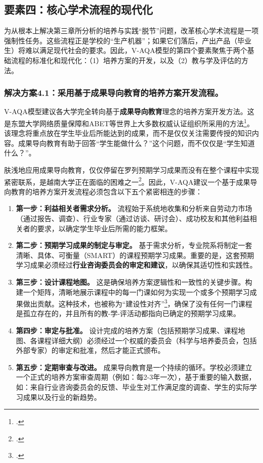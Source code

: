 

\subsection{要素四：核心学术流程的现代化}
\label{subsec:giaiphap_quytringnoibo}

为从根本上解决第三章所分析的培养与实践“脱节”问题，改革核心学术流程是一项强制性任务。这些流程正是学校的“生产机器”；如果它们落后，产出产品（毕业生）将难以满足现代社会的要求。因此，V-AQA模型的第四个要素聚焦于两个基础流程的标准化和现代化：（1）培养方案的开发，以及（2）教与学及评估的方法。

\subsubsection{解决方案4.1：采用基于成果导向教育的培养方案开发流程。}
V-AQA模型建议各大学完全转向基于\textbf{成果导向教育}理念的培养方案开发方法。这是东盟大学网络质量保障和ABET等世界上大多数权威认证组织所采用的方法\footcite{aunqa_guidelines_v4}。该理念将重点放在学生毕业后所能达到的成果，而不是仅仅关注需要传授的知识内容。成果导向教育有助于回答“学生能做什么？”这个问题，而不仅仅是“学生知道什么？”。

肤浅地应用成果导向教育，仅仅停留在罗列预期学习成果而没有在整个课程中实现紧密联系，是越南大学正在面临的困难之一\footcite{ijlter_elo_copy}。因此，V-AQA建议一个基于成果导向教育的培养方案开发流程必须包含以下五个紧密相连的步骤：

\begin{enumerate}
    \item \textbf{第一步：利益相关者需求分析。} 流程始于系统地收集和分析来自劳动力市场（通过报告、调查）、行业专家（通过访谈、研讨会）、成功校友和其他利益相关者的要求，以确定学生毕业后所需的能力框架。
    
    \item \textbf{第二步：预期学习成果的制定与审定。} 基于需求分析，专业院系将制定一套清晰、具体、可衡量（SMART）的课程预期学习成果。重要的是，这套预期学习成果必须经过\textbf{行业咨询委员会的审定和建议}，以确保其适切性和实践性。
    
    \item \textbf{第三步：设计课程地图。} 这是确保培养方案逻辑性和一致性的关键步骤。构建一个矩阵，清晰地展示课程中的每一门课如何为实现一个或多个预期学习成果做出贡献。这种技术，也被称为“建设性对齐”\footcite{biggs_constructive_alignment}，确保了没有任何一门课程是孤立存在的，并且所有的教-学-评活动都指向已确定的预期学习成果。
    
    \item \textbf{第四步：审定与批准。} 设计完成的培养方案（包括预期学习成果、课程地图、各课程详细大纲）必须经过一个权威的委员会（科学与培养委员会，包括外部专家）的审定和批准，然后才能正式颁布。
    
    \item \textbf{第五步：定期审查与改进。} 成果导向教育是一个持续的循环。学校必须建立一个正式的培养方案审查周期（例如：每2-3年一次），基于重要的输入数据，如：来自行业咨询委员会的反馈、毕业生对工作满足度的调查、学生的实际学习成果以及行业的新趋势。
\end{enumerate}

